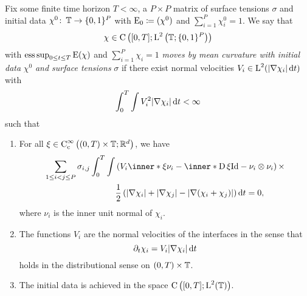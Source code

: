 \begin{definition}
	\label{motion_by_mmcf}
	Fix some finite time horizon $ T < \infty $, a $ P \times P $ matrix of surface tensions $ \sigma $ and initial data $ \chi^{ 0 } \colon \operatorname{\mathbb{T}} \to \{ 0 , 1 \}^{ P } $ with $ \operatorname{E}_{ 0 } \coloneqq ( \chi^{ 0 } ) $ and $ \sum_{ i = 1 }^{ P } \chi_{ i }^{ 0 } = 1 $. We say that
	\begin{equation*}
		\chi \in \operatorname{C} \left(
			[ 0 , T ]
			;
			\operatorname{L}^{ 2 } \left( \operatorname{\mathbb{T}} ; \{ 0 , 1 \}^{ P } \right)
		\right)
	\end{equation*}
	with $ \operatorname*{ess\,sup}_{ 0 \leq t \leq T } \operatorname{E} ( \chi ) $ and $ \sum_{ i = 1 
	}^{ P } \chi_{ i } = 1 $ \emph{moves by mean curvature with initial data} $ 
	\chi^{ 0 } $ \emph{and surface tensions} $ \sigma $ if there exist normal 
	velocities $ V_{ i } \in \operatorname{L}^{ 2 } ( \abs{ \nabla \chi_{ i } } \dd{ t } ) $ 
	with
	\begin{equation*}
		\int_{ 0 }^{ T }
			\int
				V_{ i }^{ 2 }
			\abs{ \nabla \chi_{ i } }
		\dd{ t }
		< \infty 
	\end{equation*} 
	such that
	\begin{enumerate}
		\item For all 
		$ \xi \in \operatorname{C}_{ \mathrm{c} }^{ \infty } \left(
			( 0 , T ) \times \operatorname{\mathbb{T}} ; \mathbb{ R }^{ d }
		\right)
		$, we have 
		\begin{align}
			\label{distributional_equation_mmcf}
			\sum_{ 1 \leq i < j \leq P }
				\sigma_{ i , j }
				\int_{ 0 }^{ T }
					\int
						&
						\left(
							V_{ i } \inner*{ \xi }{ \nu_{ i } }
							-
							\inner*{ \diff \xi }{ \mathrm{Id} - \nu_{ i } \otimes \nu_{ i } }
						\right)
						\times
					\\
				\notag
					& \frac{1}{ 2 }
					\left(
						\abs{ \nabla \chi_{ i } }
						+
						\abs{ \nabla \chi_{ j } }
						-
						\abs{ \nabla ( \chi_{ i } + \chi_{ j } ) }
					\right)
				\dd{ t }
			=0,			
		\end{align}
		where $ \nu_{ i } $ is the inner unit normal of $ \chi_{ i } $.
		
		\item 
		The functions $ V_{ i } $ are the normal velocities of the interfaces in the sense that
		\begin{equation*}
			\partial_{ t } \chi_{ i }
			=
			V_{ i } \abs{ \nabla \chi_{ i } } \dd{ t }
		\end{equation*}
		holds in the distributional sense on $ ( 0 , T ) \times \operatorname{\mathbb{T}} $.
		
		\item
		The initial data is achieved in the space $ \operatorname{C} \left( [ 0 , T ] ; \operatorname{L}^{ 2 } ( \operatorname{\mathbb{T}} ) \right) $.
	\end{enumerate}
\end{definition}

